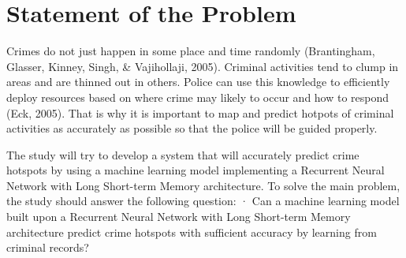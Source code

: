 \section{Statement of the Problem} %

    Crimes do not just happen in some place and time randomly (Brantingham, Glasser, Kinney, Singh, & Vajihollaji, 2005). Criminal activities tend to clump in areas and are thinned out in others. Police can use this knowledge to efficiently deploy resources based on where crime may likely to occur and how to respond (Eck, 2005). That is why it is important to map and predict hotpots of criminal activities as accurately as possible so that the police will be guided properly.

    The study will try to develop a system that will accurately predict crime hotspots by using a machine learning model implementing a Recurrent Neural Network with Long Short-term Memory architecture. To solve the main problem, the study should answer the following question:
        ·  Can a machine learning model built upon a Recurrent Neural Network with Long Short-term Memory architecture predict crime hotspots with sufficient accuracy by learning from criminal records?